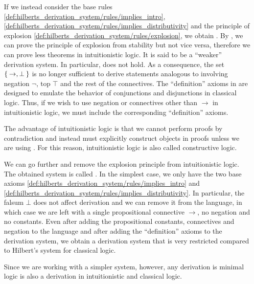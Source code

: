 \begin{remark}
\begin{RemEnum}
    If we instead consider the base rules \eqref{def:hilberts_derivation_system/rules/implies_intro}, \eqref{def:hilberts_derivation_system/rules/implies_distributivity} and the principle of explosion \eqref{def:hilberts_derivation_system/rules/explosion}, we obtain . By , we can prove the principle of explosion from stability but not vice versa, therefore we can prove less theorems in intuitionistic logic. It is said to be a \enquote{weaker} derivation system. In particular,  does not hold. As a consequence, the set \( \Set{ \rightarrow, \bot } \) is no longer sufficient to derive statements analogous to  involving negation \( \neg \), top \( \top \) and the rest of the connectives. The \enquote{definition} axioms in  are designed to emulate the behavior of conjunctions and disjunctions in classical logic. Thus, if we wish to use negation or connectives other than \( \rightarrow \) in intuitionistic logic, we must include the corresponding \enquote{definition} axioms.

    The advantage of intuitionistic logic is that we cannot perform proofs by contradiction and instead must explicitly construct objects in proofs unless we are using . For this reason, intuitionistic logic is also called constructive logic.

     We can go further and remove the explosion principle from intuitionistic logic. The obtained system is called . In the simplest case, we only have the two base axioms \eqref{def:hilberts_derivation_system/rules/implies_intro} and \eqref{def:hilberts_derivation_system/rules/implies_distributivity}. In particular, the falsum \( \bot \) does not affect derivation and we can remove it from the language, in which case we are left with a single propositional connective \( \rightarrow \), no negation and no constants. Even after adding the propositional constants, connectives and negation to the language and after adding the \enquote{definition} axioms to the derivation system, we obtain a derivation system that is very restricted compared to Hilbert's system for classical logic.

    Since we are working with a simpler system, however, any derivation is minimal logic is also a derivation in intuitionistic and classical logic.
  \end{RemEnum}
\end{remark}

